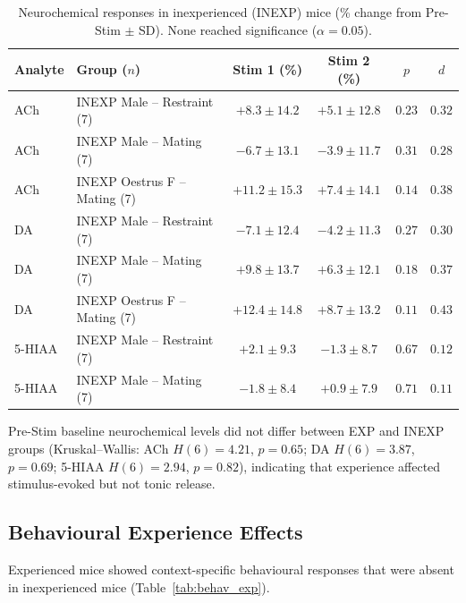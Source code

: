 \documentclass[11pt]{article}
\begin{document}
\begin{table}[H]
\centering
\caption{Neurochemical responses in inexperienced (INEXP) mice (\% change from Pre-Stim $\pm$ SD). None reached significance ($\alpha = 0.05$).}
\label{tab:inexp}
\begin{tabular}{llcccc}
\toprule
Analyte & Group ($n$) & Stim 1 (\%) & Stim 2 (\%) & $p$ & $d$ \\
\midrule
ACh & INEXP Male -- Restraint (7) & $+8.3 \pm 14.2$ & $+5.1 \pm 12.8$ & $0.23$ & $0.32$ \\
ACh & INEXP Male -- Mating (7) & $-6.7 \pm 13.1$ & $-3.9 \pm 11.7$ & $0.31$ & $0.28$ \\
ACh & INEXP Oestrus F -- Mating (7) & $+11.2 \pm 15.3$ & $+7.4 \pm 14.1$ & $0.14$ & $0.38$ \\
DA & INEXP Male -- Restraint (7) & $-7.1 \pm 12.4$ & $-4.2 \pm 11.3$ & $0.27$ & $0.30$ \\
DA & INEXP Male -- Mating (7) & $+9.8 \pm 13.7$ & $+6.3 \pm 12.1$ & $0.18$ & $0.37$ \\
DA & INEXP Oestrus F -- Mating (7) & $+12.4 \pm 14.8$ & $+8.7 \pm 13.2$ & $0.11$ & $0.43$ \\
5-HIAA & INEXP Male -- Restraint (7) & $+2.1 \pm 9.3$ & $-1.3 \pm 8.7$ & $0.67$ & $0.12$ \\
5-HIAA & INEXP Male -- Mating (7) & $-1.8 \pm 8.4$ & $+0.9 \pm 7.9$ & $0.71$ & $0.11$ \\
\bottomrule
\end{tabular}
\end{table}

Pre-Stim baseline neurochemical levels did not differ between EXP and INEXP groups (Kruskal--Wallis: ACh $H(6) = 4.21$, $p = 0.65$; DA $H(6) = 3.87$, $p = 0.69$; 5-HIAA $H(6) = 2.94$, $p = 0.82$), indicating that experience affected stimulus-evoked but not tonic release.

\subsection{Behavioural Experience Effects}

Experienced mice showed context-specific behavioural responses that were absent in inexperienced mice (Table~\ref{tab:behav_exp}).
\end{document}

